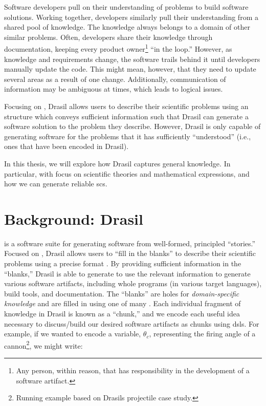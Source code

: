 Software developers pull on their understanding of problems to build software
solutions. Working together, developers similarly pull their understanding from
a shared pool of knowledge. The knowledge always belongs to a domain of other
similar problems. Often, developers share their knowledge through documentation,
keeping every product owner\footnote{Any person, within reason, that has
      responsibility in the development of a software artifact.} ``in the loop.''
However, as knowledge and requirements change, the software trails behind it
until developers manually update the code. This might mean, however, that they
need to update several areas as a result of one change. Additionally,
communication of information may be ambiguous at times, which leads to logical
issues.

Focusing on , Drasil allows users to describe their scientific problems
using an  structure which conveys sufficient information such that
Drasil can generate a software solution to the problem they describe. However,
Drasil is only capable of generating software for the problems that it has
sufficiently ``understood'' (i.e., ones that have been encoded in Drasil).

In this thesis, we will explore how Drasil captures general knowledge. In
particular, with focus on scientific theories and mathematical expressions, and
how we can generate reliable \acs{scs}.

\section{Background: Drasil}
\label{chap:introduction:sec:background}

 is a software suite
for generating software from well-formed, principled ``stories.'' Focused on
, Drasil allows users to ``fill in the blanks'' to describe their
scientific problems using a precise  format \cite{SmithAndLai2005}. By
providing sufficient information in the ``blanks,'' Drasil is able to generate
to use the relevant information to generate various software artifacts,
including whole programs (in various target languages), build tools, and
documentation. The ``blanks'' are holes for \textit{domain-specific knowledge}
and are filled in using one of many . Each individual fragment of
knowledge in Drasil is known as a ``chunk,'' and we encode each useful idea
necessary to discuss/build our desired software artifacts as chunks using
\acsp{dsl}. For example, if we wanted to encode a variable, \(\theta{}_{c}\),
representing the firing angle of a cannon\footnote{Running example based on
      Drasils \acs{projectile} case study.}, we might write:

